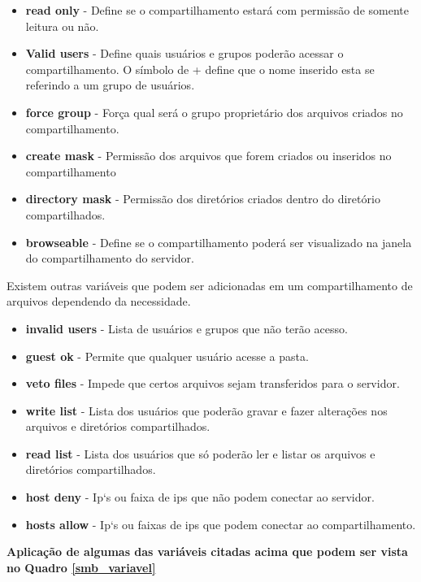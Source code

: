 \begin{itemize}
	\item \textbf{read only} - Define se o compartilhamento estará com permissão de somente leitura ou não.
	\item \textbf{Valid users} - Define quais usuários e grupos poderão acessar o compartilhamento. O símbolo de + define que o nome inserido esta se referindo a um grupo de usuários.
	\item \textbf{force group} - Força qual será o grupo proprietário dos arquivos criados no compartilhamento.
	\item \textbf{create mask} - Permissão dos arquivos que forem criados ou inseridos no compartilhamento
	\item \textbf{directory mask} - Permissão dos diretórios criados dentro do diretório compartilhados.
	\item \textbf{browseable} - Define se o compartilhamento poderá ser visualizado na janela do compartilhamento do servidor.
\end{itemize}

Existem outras variáveis que podem ser adicionadas em um compartilhamento de arquivos dependendo da necessidade.

\begin{itemize}
	\item \textbf{invalid users} - Lista de usuários e grupos que não terão acesso.
	\item \textbf{guest ok} - Permite que qualquer usuário acesse a pasta.
	\item \textbf{veto files} - Impede que certos arquivos sejam transferidos para o servidor.
	\item \textbf{write list} - Lista dos usuários que poderão gravar e fazer alterações nos arquivos e diretórios compartilhados.
	\item \textbf{read list} - Lista dos usuários que só poderão ler e listar os arquivos e diretórios compartilhados.
	\item \textbf{host deny} - Ip`s ou faixa de ips que não podem conectar ao servidor.
	\item \textbf{hosts allow} - Ip`s ou faixas de ips que podem conectar ao compartilhamento.
\end{itemize}

\textbf{Aplicação de algumas das variáveis citadas acima que podem ser vista no Quadro \ref{smb_variavel}}\\

